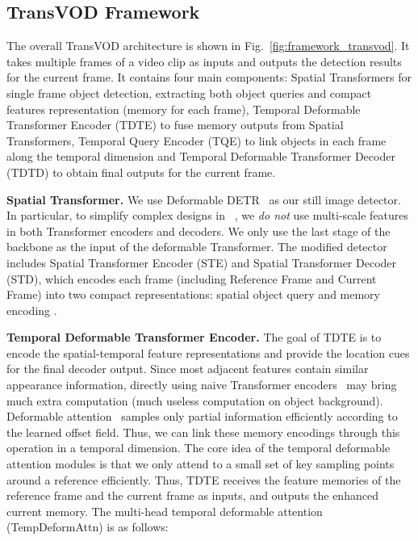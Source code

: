\documentclass[10pt,journal,compsoc]{IEEEtran}
\begin{document}
\subsection{TransVOD Framework} 
\label{sec:TransVOD}
The overall TransVOD architecture is shown in Fig.~\ref{fig:framework_transvod}. It takes multiple frames of a video clip as inputs and outputs the detection results for the current frame. It contains four main components: Spatial Transformers for single frame object detection, extracting both object queries and compact features representation (memory for each frame), Temporal Deformable Transformer Encoder (TDTE) to fuse memory outputs from Spatial Transformers, Temporal Query Encoder (TQE) to link objects in each frame along the temporal dimension and Temporal Deformable Transformer Decoder (TDTD) to obtain final outputs for the current frame.

\vspace{-4mm}
\noindent
\textbf{Spatial Transformer.} We use Deformable DETR~\cite{zhu2020deformable} as our still image detector. In particular, to simplify complex designs in ~\cite{zhu2020deformable}, we \emph{do not} use multi-scale features in both Transformer encoders and decoders. We only use the last stage of the backbone as the input of the deformable Transformer. The modified detector includes Spatial Transformer Encoder (STE) and Spatial Transformer Decoder (STD), which encodes each frame  (including Reference Frame and Current Frame) into two compact representations: spatial object query  and memory encoding .


\vspace{-4mm}
\noindent
\textbf{Temporal Deformable Transformer Encoder.}
The goal of TDTE is to encode the spatial-temporal feature representations and provide the location cues for the final decoder output. Since most adjacent features contain similar appearance information, directly using naive Transformer encoders~\cite{detr,Vaswani17attention} may bring much extra computation (much useless computation on object background). Deformable attention~\cite{zhu2020deformable} samples only partial information efficiently according to the learned offset field. Thus, we can link these memory encodings  through this operation in a temporal dimension. The core idea of the temporal deformable attention modules is that we only attend to a small set of key sampling points around a reference efficiently.  Thus, TDTE receives the feature memories of the reference frame and the current frame as inputs, and outputs the enhanced current memory. The multi-head temporal deformable attention (TempDeformAttn) is as follows:
\end{document}
